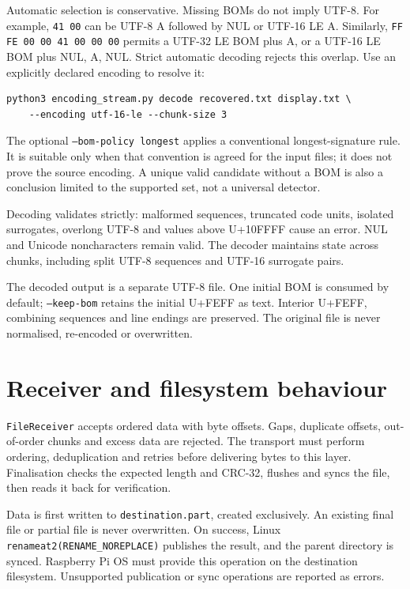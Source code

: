 \documentclass[10pt,a4paper]{article}
\begin{document}
Automatic selection is conservative. Missing BOMs do not imply UTF-8.
For example, \texttt{41 00} can be UTF-8 A followed by NUL or UTF-16 LE A.
Similarly, \texttt{FF FE 00 00 41 00 00 00} permits a UTF-32 LE BOM plus A,
or a UTF-16 LE BOM plus NUL, A, NUL. Strict automatic decoding rejects this
overlap. Use an explicitly declared encoding to resolve it:
\begin{verbatim}
python3 encoding_stream.py decode recovered.txt display.txt \
    --encoding utf-16-le --chunk-size 3
\end{verbatim}
The optional \texttt{--bom-policy longest} applies a conventional longest-signature
rule. It is suitable only when that convention is agreed for the input files;
it does not prove the source encoding. A unique valid candidate without a BOM is
also a conclusion limited to the supported set, not a universal detector.

Decoding validates strictly: malformed sequences, truncated code units, isolated
surrogates, overlong UTF-8 and values above U+10FFFF cause an error. NUL and Unicode
noncharacters remain valid. The decoder maintains state across chunks, including
split UTF-8 sequences and UTF-16 surrogate pairs.

The decoded output is a separate UTF-8 file. One initial BOM is consumed by
default; \texttt{--keep-bom} retains the initial U+FEFF as text. Interior U+FEFF,
combining sequences and line endings are preserved. The original file is never
normalised, re-encoded or overwritten.

\section{Receiver and filesystem behaviour}
\texttt{FileReceiver} accepts ordered data with byte offsets. Gaps, duplicate
offsets, out-of-order chunks and excess data are rejected. The transport must
perform ordering, deduplication and retries before delivering bytes to this layer.
Finalisation checks the expected length and CRC-32, flushes and syncs the file,
then reads it back for verification.

Data is first written to \texttt{destination.part}, created exclusively.
An existing final file or partial file is never overwritten. On success, Linux
\texttt{renameat2(RENAME\_NOREPLACE)} publishes the result, and the parent directory
is synced. Raspberry Pi OS must provide this operation on the destination
filesystem. Unsupported publication or sync operations are reported as errors.
\end{document}
